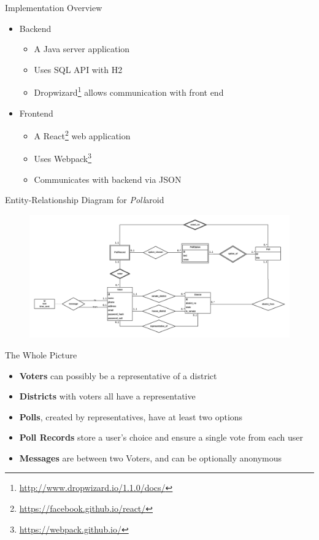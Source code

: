 \documentclass[11pt,aps,prb,groupedaddress,nofootinbib,floatfix]{beamer}
\newcommand{\pollaroid}{\emph{Poll}aroid}
\begin{document}
\begin{frame}{Implementation Overview}
\begin{itemize}
	\item Backend
	\begin{itemize}
		\item A Java server application
		\item Uses SQL API with H2
		\item Dropwizard\footnote{\url{http://www.dropwizard.io/1.1.0/docs/}} allows communication with front end 
	\end{itemize}
	\item Frontend
	\begin{itemize}
		\item A React\footnote{\url{https://facebook.github.io/react/}} web application
		\item Uses Webpack\footnote{\url{https://webpack.github.io/}}
		\item Communicates with backend via JSON
	\end{itemize}
\end{itemize}
\end{frame}

\begin{frame}{Entity-Relationship Diagram for \pollaroid}
\begin{center}
\begin{figure}[t]
\includegraphics[scale=0.13]{er_diag.png}
\end{figure}
\end{center}
\end{frame}

\begin{frame}{The Whole Picture}
\begin{itemize}
	\item \textbf{Voters} can possibly be a representative of a district
	\item \textbf{Districts} with voters all have a representative
	\item \textbf{Polls}, created by representatives, have at least two options
	\item \textbf{Poll Records} store a user's choice and ensure a single vote from each user
	\item \textbf{Messages} are between two Voters, and can be optionally anonymous
\end{itemize}
\end{frame}
\end{document}

